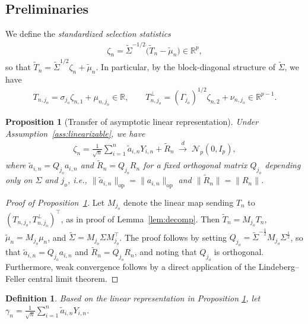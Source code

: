 \documentclass[12pt]{article}
\newcommand{\op}{\mathrm{op}}
\newtheorem{proposition}{Proposition}[section]
\newtheorem{definition}{Definition}[section]
\newcommand{\real}{\mathbb{R}}
\begin{document}
\begin{appendices}
\subsection{Preliminaries}
We define the \emph{standardized selection statistics} 
\begin{align}
  \label{eq:zeta}
  \zeta_n
  =\widetilde\Sigma^{-1/2}\big(\widetilde T_n-\widetilde\mu_n\big)
   \in\real^p,
\end{align}
so that $\widetilde T_n=\widetilde\Sigma^{1/2}\zeta_n+\widetilde\mu_n$. In particular, by the block-diagonal structure of $\widetilde\Sigma$, we have
\begin{align}
\label{eq:blocks-zeta}
T_{n,j_o}=\sigma_{j_o}\zeta_{n,1}+\mu_{n,j_o}\in\real,
  \qquad
  T_{n,j_o}^\perp
  =(\Gamma_{j_o})^{1/2}\zeta_{n,2}+\nu_{n,j_o}\in\real^{p-1}.
\end{align}

\begin{proposition}[Transfer of asymptotic linear representation]
\label{prop:clt-decomp}
Under Assumption~\ref{ass:linearizable}, we have
\begin{align}
\label{eq:zeta-alr}
  \zeta_n
  =\frac{1}{\sqrt n}\sum_{i=1}^n\widetilde a_{i,n}Y_{i,n}+\widetilde R_n
  \;\xrightarrow{d}\;\mathcal N_p(0,I_p),
\end{align}
where $\widetilde a_{i,n}=Q_{j_o}a_{i,n}$ and $\widetilde R_n=Q_{j_o}R_n$ for a fixed orthogonal matrix $Q_{j_o}$ depending only on $\Sigma$ and $j_o$, i.e., 
$\|\widetilde a_{i,n}\|_{\op}=\|a_{i,n}\|_{\op}$ and
$\|\widetilde R_n\|=\|R_n\|$.
\end{proposition}


\begin{proof}[Proof of Proposition~\ref{prop:clt-decomp}]
Let $M_{j_o}$ denote the linear map sending $T_n$ to $(T_{n,j_o},T_{n,j_o}^\perp)^\top$, as in proof of Lemma~\ref{lem:decomp}. Then $\widetilde T_n=M_{j_o}T_n$, $\widetilde\mu_n=M_{j_o}\mu_n$, and $\widetilde\Sigma=M_{j_o}\Sigma M_{j_o}^\top$. 
The proof follows by setting $Q_{j_o}=\widetilde\Sigma^{-\frac{1}{2}}M_{j_o}\Sigma^{\frac{1}{2}}$, so that $\widetilde a_{i,n}=Q_{j_o}a_{i,n}$ and $\widetilde R_n=Q_{j_o}R_n$, and noting that $Q_{j_o}$ is orthogonal. Furthermore, weak convergence follows by a direct application of the Lindeberg--Feller central limit theorem.
\end{proof}

\begin{definition}
\label{def:gamma}
Based on the linear representation in Proposition \ref{prop:clt-decomp}, let $\gamma_n=\frac{1}{\sqrt n}\sum_{i=1}^n\widetilde a_{i,n}Y_{i,n}$.
\end{definition}


\end{appendices}
\end{document}

